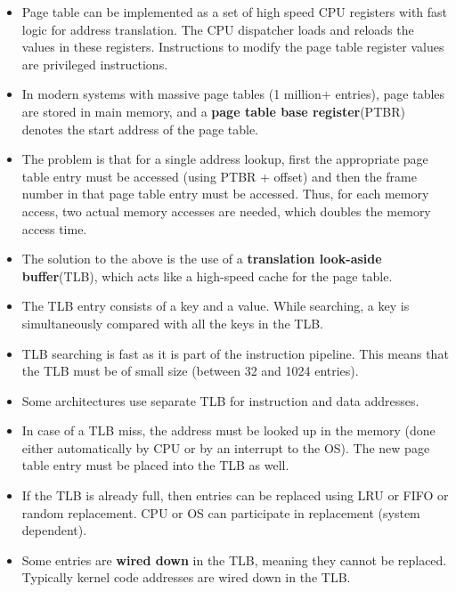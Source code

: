 \documentclass{article}
\theoremstyle{plain}
\theoremstyle{definition}
\begin{document}
\begin{itemize}
    \item Page table can be implemented as a set of high speed CPU registers with fast logic for address translation. The CPU dispatcher loads and reloads the values in these registers. Instructions to modify the page table register values are privileged instructions.

    \item In modern systems with massive page tables (1 million+ entries), page tables are stored in main memory, and a \textbf{page table base register}(PTBR) denotes the start address of the page table. 
    
    \item The problem is that for a single address lookup, first the appropriate page table entry must be accessed (using PTBR + offset) and then the frame number in that page table entry must be accessed. Thus, for each memory access, two actual memory accesses are needed, which doubles the memory access time.
    
    \item The solution to the above is the use of a \textbf{translation look-aside buffer}(TLB), which acts like a high-speed cache for the page table. 
    
    \item The TLB entry consists of a key and a value. While searching, a key is simultaneously compared with all the keys in the TLB. 
    
    \item TLB searching is fast as it is part of the instruction pipeline. This means that the TLB must be of small size (between 32 and 1024 entries). 
    
    \item Some architectures use separate TLB for instruction and data addresses. 
    
    \item In case of a TLB miss, the address must be looked up in the memory (done either automatically by CPU or by an interrupt to the OS). The new page table entry must be placed into the TLB as well. 
    
    \item If the TLB is already full, then entries can be replaced using LRU or FIFO or random replacement. CPU or OS can participate in replacement (system dependent). 
    
    \item Some entries are \textbf{wired down} in the TLB, meaning they cannot be replaced. Typically kernel code addresses are wired down in the TLB. 
    

\end{itemize}
\end{document}
